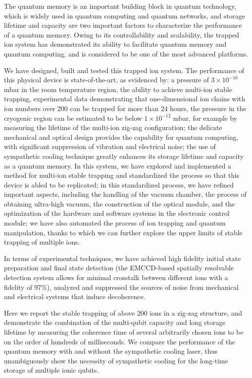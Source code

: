 \begin{abstract*}

  The quantum memory is an important building block in quantum technology, which is widely used in quantum computing and quantum networks, and storage lifetime and capacity are two important factors to characterize the performance of a quantum memory. Owing to its controllability and scalability, the trapped ion system has demonstrated its ability to facilitate quantum memory and quantum computing, and is considered to be one of the most advanced platforms.

  We have designed, built and tested this trapped ion system. The performance of this physical device is state-of-the-art, as evidenced by: a pressure of $3 \times {10}^{-10}$ mbar in the room temperature region, the ability to achieve multi-ion stable trapping, experimental data demonstrating that one-dimensional ion chains with ion numbers over 200 can be trapped for more than 24 hours, the pressure in the cryogenic region can be estimated to be below $1 \times {10}^{-12}$ mbar, for example by measuring the lifetime of the multi-ion zig-zag configuration; the delicate mechanical and optical design provides the capability for quantum computing, with significant suppression of vibration and electrical noise; the use of sympathetic cooling technique greatly enhances its storage lifetime and capacity as a quantum memory. In this system, we have explored and implemented a method for multi-ion stable trapping and standardized the process so that this device is abled to be replicated; in this standardized process, we have refined important aspects, including the handling of the vacuum chamber, the process of obtaining ultra-high vacuum, the construction of the optical module, and the optimization of the hardware and software systems in the electronic control module; we have also automated the process of ion trapping and quantum manipulation, thanks to which we can further explore the upper limits of stable trapping of multiple ions.

  In terms of experimental techniques, we have achieved high fidelity initial state preparation and final state detection (the EMCCD-based spatially resolvable detection system allows for minimal crosstalk between different ions with a fidelity of 97\%), analyzed and suppressed the sources of noise from mechanical and electrical systems that induce decoherence.

  Here we report the stable trapping of above 200 ions in a zig-zag structure, and demonstrate the combination of the multi-qubit capacity and long storage lifetime by measuring the coherence time of several arbitrarily chosen ions to be on the order of hundreds of milliseconds. We compare the performance of the quantum memory with and without the sympathetic cooling laser, thus unambiguously show the necessity of sympathetic cooling for the long-time storage of multiple ionic qubits.


\end{abstract*}
